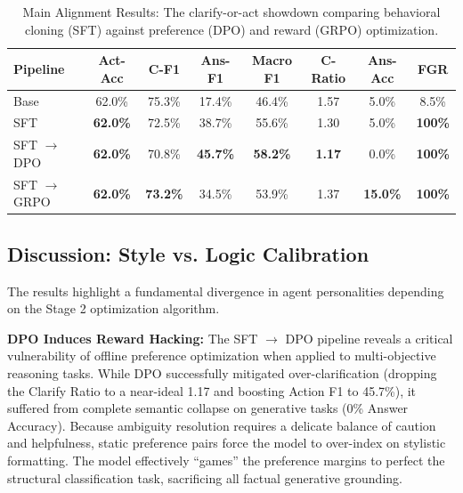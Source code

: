 \documentclass{article}
\theoremstyle{plain}
\theoremstyle{definition}
\theoremstyle{remark}
\begin{document}
\begin{table}[!ht]
  \caption{Main Alignment Results: The clarify-or-act showdown comparing behavioral cloning (SFT) against preference (DPO) and reward (GRPO) optimization.}
  \label{tab:main_results}
  \begin{center}
    \begin{small}
      \begin{sc}
        \begin{tabular}{lccccccc}
          \toprule
          Pipeline & Act-Acc & C-F1 & Ans-F1 & Macro F1 & C-Ratio & Ans-Acc & FGR \\
          \midrule
          Base & 62.0\% & 75.3\% & 17.4\% & 46.4\% & 1.57 & 5.0\% & 8.5\% \\
          SFT & \textbf{62.0\%} & 72.5\% & 38.7\% & 55.6\% & 1.30 & 5.0\% & \textbf{100\%} \\
          SFT $\rightarrow$ DPO & \textbf{62.0\%} & 70.8\% & \textbf{45.7\%} & \textbf{58.2\%} & \textbf{1.17} & 0.0\% & \textbf{100\%} \\
          SFT $\rightarrow$ GRPO & \textbf{62.0\%} & \textbf{73.2\%} & 34.5\% & 53.9\% & 1.37 & \textbf{15.0\%} & \textbf{100\%} \\
          \bottomrule
        \end{tabular}
      \end{sc}
    \end{small}
  \end{center}
\end{table}

\subsection{Discussion: Style vs. Logic Calibration}
The results highlight a fundamental divergence in agent personalities depending on the Stage 2 optimization algorithm. 

\textbf{DPO Induces Reward Hacking:} The SFT $\rightarrow$ DPO pipeline reveals a critical vulnerability of offline preference optimization when applied to multi-objective reasoning tasks. While DPO successfully mitigated over-clarification (dropping the Clarify Ratio to a near-ideal 1.17 and boosting Action F1 to 45.7\%), it suffered from complete semantic collapse on generative tasks (0\% Answer Accuracy). Because ambiguity resolution requires a delicate balance of caution and helpfulness, static preference pairs force the model to over-index on stylistic formatting. The model effectively ``games'' the preference margins to perfect the structural classification task, sacrificing all factual generative grounding.
\end{document}
